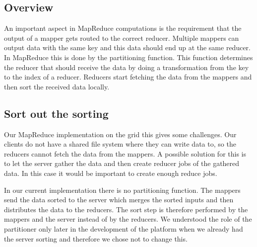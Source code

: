 \subsection{Overview}

An important aspect in MapReduce computations is the requirement that the output of a mapper
gets routed to the correct reducer.
Multiple mappers can output data with the same key and this data should end up
at the same reducer.
In MapReduce this is done by the partitioning function. This function determines
the reducer that should receive the data by doing a transformation from the key
to the index of a reducer. Reducers start fetching the data from the mappers and
then sort the received data locally.

\subsection{Sort out the sorting}

Our MapReduce implementation on the grid this gives some challenges.
Our clients do not have a shared file system where they can write data to, so
the reducers cannot fetch the data from the mappers.
A possible solution for this is to let the server gather the data and then
create reducer jobs of the gathered data.
In this case it would be important to create enough reduce jobs.

In our current implementation there is no partitioning function. The mappers
send the data sorted to the server which merges the sorted inputs
and then distributes the data to the reducers. The sort step is therefore
performed by the mappers and the server instead of by the reducers.
We understood the role of the partitioner only later in the development of the platform
when we already had the server sorting and therefore we chose not to change this.